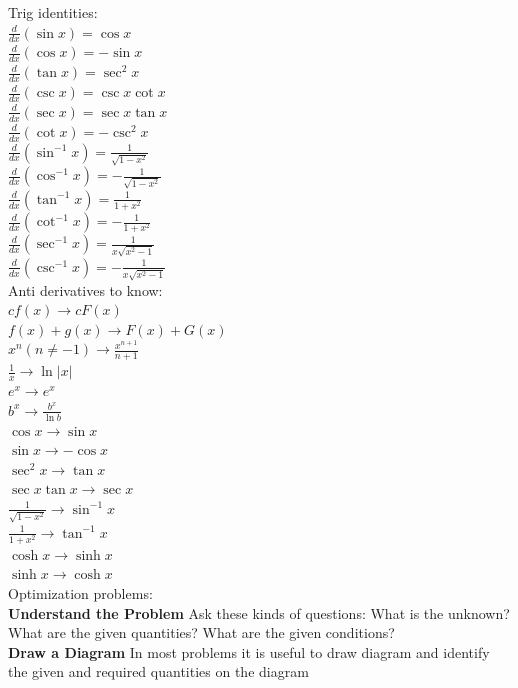 \documentclass[10pt,a4paper]{article}
\begin{document}
Trig identities:
\\	$\frac{d}{dx}(\sin{x}) = \cos{x}$
\\	$\frac{d}{dx}(\cos{x}) = -\sin{x}$
\\	$\frac{d}{dx}(\tan{x}) = \sec^{2}{x}$
\\	$\frac{d}{dx}(\csc{x}) = \csc{x}\cot{x}$
\\	$\frac{d}{dx}(\sec{x})= \sec{x}\tan{x}$
\\	$\frac{d}{dx}(\cot{x}) = -\csc^{2}{x}$
\\	$\frac{d}{dx}(\sin^{-1}{x}) = \frac{1}{\sqrt{1-x^{2}}}$
\\	$\frac{d}{dx}(\cos^{-1}{x}) = -\frac{1}{\sqrt{1-x^{2}}}$
\\	$\frac{d}{dx}(\tan^{-1}{x}) = \frac{1}{1+x^{2}}$
\\ $\frac{d}{dx}(\cot^{-1}{x}) = -\frac{1}{1+x^{2}}$
\\ $\frac{d}{dx}(\sec^{-1}{x}) = \frac{1}{x\sqrt{x^{2}-1}}$
\\ $\frac{d}{dx}(\csc^{-1}{x}) = -\frac{1}{x\sqrt{x^{2}-1}}$	
\\Anti derivatives to know:	
\\	$cf(x) \rightarrow cF(x)$
\\	$f(x) + g(x) \rightarrow F(x) + G(x)$
\\	$x^{n}(n \neq -1) \rightarrow \frac{x^{n+1}}{n+1}$
\\	$\frac{1}{x} \rightarrow \ln{|x|}$
\\	$e^{x} \rightarrow e^{x}$
\\	$b^{x} \rightarrow \frac{b^{x}}{\ln{b}}$
\\	$\cos{x} \rightarrow \sin{x} $
\\	$\sin{x} \rightarrow -\cos{x}$
\\	$\sec^{2}{x} \rightarrow \tan{x}$
\\	$\sec{x} \tan{x} \rightarrow \sec{x}$
\\	$\frac{1}{\sqrt{1-x^{2}}} \rightarrow \sin^{-1}{x}$
\\	$\frac{1}{1+x^{2}} \rightarrow \tan^{-1}{x}$
\\	$\cosh{x} \rightarrow \sinh{x}$
\\	$\sinh{x} \rightarrow \cosh{x}$
\\ Optimization problems:
\\	\textbf{Understand the Problem} Ask these kinds of questions: What is the unknown? What are the given quantities? What are the given conditions?
\\	\textbf{Draw a Diagram} In most problems it is useful to draw diagram and identify the given and required quantities on the diagram
\end{document}
